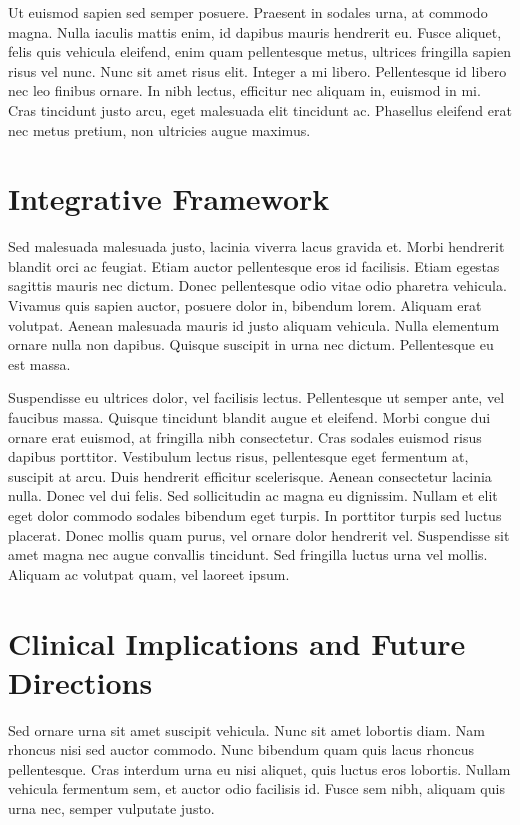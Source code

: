 Ut euismod sapien sed semper posuere. Praesent in sodales urna, at commodo magna. Nulla iaculis mattis enim, id dapibus mauris hendrerit eu. Fusce aliquet, felis quis vehicula eleifend, enim quam pellentesque metus, ultrices fringilla sapien risus vel nunc. Nunc sit amet risus elit. Integer a mi libero. Pellentesque id libero nec leo finibus ornare. In nibh lectus, efficitur nec aliquam in, euismod in mi. Cras tincidunt justo arcu, eget malesuada elit tincidunt ac. Phasellus eleifend erat nec metus pretium, non ultricies augue maximus.

\section{Integrative Framework}

Sed malesuada malesuada justo, lacinia viverra lacus gravida et. Morbi hendrerit blandit orci ac feugiat. Etiam auctor pellentesque eros id facilisis. Etiam egestas sagittis mauris nec dictum. Donec pellentesque odio vitae odio pharetra vehicula. Vivamus quis sapien auctor, posuere dolor in, bibendum lorem. Aliquam erat volutpat. Aenean malesuada mauris id justo aliquam vehicula. Nulla elementum ornare nulla non dapibus. Quisque suscipit in urna nec dictum. Pellentesque eu est massa.

Suspendisse eu ultrices dolor, vel facilisis lectus. Pellentesque ut semper ante, vel faucibus massa. Quisque tincidunt blandit augue et eleifend. Morbi congue dui ornare erat euismod, at fringilla nibh consectetur. Cras sodales euismod risus dapibus porttitor. Vestibulum lectus risus, pellentesque eget fermentum at, suscipit at arcu. Duis hendrerit efficitur scelerisque. Aenean consectetur lacinia nulla. Donec vel dui felis. Sed sollicitudin ac magna eu dignissim. Nullam et elit eget dolor commodo sodales bibendum eget turpis. In porttitor turpis sed luctus placerat. Donec mollis quam purus, vel ornare dolor hendrerit vel. Suspendisse sit amet magna nec augue convallis tincidunt. Sed fringilla luctus urna vel mollis. Aliquam ac volutpat quam, vel laoreet ipsum.


\section{Clinical Implications and Future Directions}

Sed ornare urna sit amet suscipit vehicula. Nunc sit amet lobortis diam. Nam rhoncus nisi sed auctor commodo. Nunc bibendum quam quis lacus rhoncus pellentesque. Cras interdum urna eu nisi aliquet, quis luctus eros lobortis. Nullam vehicula fermentum sem, et auctor odio facilisis id. Fusce sem nibh, aliquam quis urna nec, semper vulputate justo.

